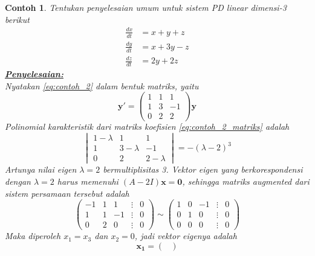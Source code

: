 \documentclass[a4paper]{article}
\theoremstyle{definisi}
\newtheorem{contoh}{Contoh}[section]
\newcommand{\penyelesaian}{\textbf{\underline{Penyelesaian:}}\\}
\numberwithin{equation}{section}
\begin{document}
  \begin{contoh}
    Tentukan penyelesaian umum untuk sistem PD linear dimensi-3 berikut
    \begin{equation}\label{eq:contoh_2}
      \begin{split}
        \frac{dx}{dt}&=x+y+z\\
        \frac{dy}{dt}&=x+3y-z\\
        \frac{dz}{dt}&=2y+2z
      \end{split}
    \end{equation}
    \penyelesaian
    Nyatakan \eqref{eq:contoh_2} dalam bentuk matriks, yaitu
    \begin{equation}
      \mathbf{y'}=\begin{pmatrix}\label{eq:contoh_2_matriks}
        1&1&1\\
        1&3&-1\\
        0&2&2
      \end{pmatrix}\mathbf{y}
    \end{equation}
    Polinomial karakteristik dari matriks koefisien \eqref{eq:contoh_2_matriks} adalah
    \begin{equation*}
      \begin{vmatrix}
        1-\lambda&1&1\\
        1&3-\lambda&-1\\
        0&2&2-\lambda
      \end{vmatrix}=-(\lambda-2)^3
    \end{equation*}
    Artunya nilai eigen $\lambda=2$ bermultiplisitas 3. Vektor eigen yang berkorespondensi dengan $\lambda=2$ harus memenuhi $(A-2I)\mathbf{x}=\mathbf{0}$, sehingga matriks \textit{augmented} dari sistem persamaan tersebut adalah
    \begin{equation*}
      \begin{pmatrix}
        -1&1&1&\vdots&0\\
        1&1&-1&\vdots&0\\
        0&2&0&\vdots&0
      \end{pmatrix}\sim
      \begin{pmatrix}
        1&0&-1&\vdots&0\\
        0&1&0&\vdots&0\\
        0&0&0&\vdots&0
      \end{pmatrix}
    \end{equation*}
    Maka diperoleh $x_1=x_3$ dan $x_2=0$, jadi vektor eigenya adalah
    \begin{equation*}
      \mathbf{x_1}=\begin{pmatrix}

\end{pmatrix}
\end{equation*}
\end{contoh}
\end{document}
